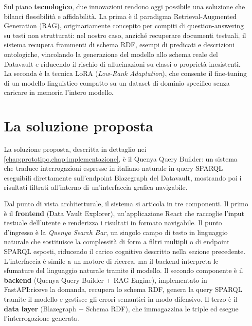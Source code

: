Sul piano \textbf{tecnologico}, due innovazioni rendono oggi possibile una soluzione che bilanci flessibilità e affidabilità. La prima è il paradigma Retrieval-Augmented Generation (RAG), originariamente concepito per compiti di question-answering su testi non strutturati: nel nostro caso, anziché recuperare documenti testuali, il sistema recupera frammenti di schema RDF, esempi di predicati e descrizioni ontologiche, vincolando la generazione del modello allo schema reale del Datavault e riducendo il rischio di allucinazioni su classi o proprietà inesistenti. La seconda è la tecnica LoRA (\textit{Low-Rank Adaptation}), che consente il fine-tuning di un modello linguistico compatto su un dataset di dominio specifico senza caricare in memoria l'intero modello.

\section{La soluzione proposta}\label{sec:soluzione_intro}

La soluzione proposta, descritta in dettaglio nei \cref{chap:prototipo,chap:implementazione}, è il Quenya Query Builder: un sistema che traduce interrogazioni espresse in italiano naturale in query SPARQL eseguibili direttamente sull'endpoint Blazegraph del Datavault, mostrando poi i risultati filtrati all'interno di un'interfaccia grafica navigabile.

Dal punto di vista architetturale, il sistema si articola in tre componenti. Il primo è il \textbf{frontend} (Data Vault Explorer), un'applicazione React che raccoglie l'input testuale dell'utente e renderizza i risultati in formato navigabile. Il punto d'ingresso è la \textit{Quenya Search Bar}, un singolo campo di testo in linguaggio naturale che sostituisce la complessità di form a filtri multipli o di endpoint SPARQL esposti, riducendo il carico cognitivo descritto nella sezione precedente. L'interfaccia è simile a un motore di ricerca, ma il backend interpreta le sfumature del linguaggio naturale tramite il modello. Il secondo componente è il \textbf{backend} (Quenya Query Builder + RAG Engine), implementato in FastAPI:\@ riceve la domanda, recupera lo schema RDF, genera la query SPARQL tramite il modello e gestisce gli errori semantici in modo difensivo. Il terzo è il \textbf{data layer} (Blazegraph + Schema RDF), che immagazzina le triple ed esegue l'interrogazione generata.

